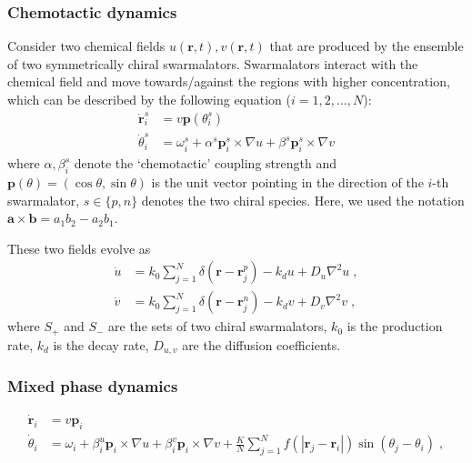 \documentclass{article}
\begin{document}
\subsubsection{Chemotactic dynamics}

Consider two chemical fields $u\left( \mathbf{r},t \right), v\left( \mathbf{r},t \right)$ that are produced by the ensemble of two symmetrically chiral swarmalators. Swarmalators interact with the chemical field and move towards/against the regions with higher concentration, which can be described by the following equation ($i=1, 2, \dots, N$):
\begin{subequations}
    \begin{align}
        \dot{\mathbf{r}}_{i}^{s}&=v\mathbf{p}\left(\theta_{i}^{s}\right)\\
        \dot{\theta}_{i}^{s}&=\omega _{i}^{s}+\alpha ^{s}\mathbf{p}_{i}^{s}\times \nabla u+\beta ^{s}\mathbf{p}_{i}^{s}\times \nabla v
    \end{align}
\end{subequations}
where $\alpha, \beta _{i}^{s}$ denote the ‘chemotactic’ coupling strength and $\mathbf{p}\left(\theta\right)=(\cos \theta,\sin \theta )$ is the unit vector pointing in the direction of the $i$-th swarmalator, $s\in\{p, n\}$ denotes the two chiral species. Here, we used the notation $\mathbf{a}\times\mathbf{b}=a_1 b_2-a_2 b_1$.

These two fields evolve as
\begin{subequations}
    \begin{align}
    \dot{u}&=k_0\sum_{j=1}^N{\delta \left( \mathbf{r}-\mathbf{r}_{j}^{p} \right)}-k_du+D_u\nabla ^2u\;,\\
    \dot{v}&=k_0\sum_{j=1}^N{\delta \left( \mathbf{r}-\mathbf{r}_{j}^{n} \right)}-k_dv+D_v\nabla ^2v\;,
    \end{align}
\end{subequations}
where $S_+$ and $S_-$ are the sets of two chiral swarmalators, $k_0$ is the production rate, $k_d$ is the decay rate, $D_{u,v}$ are the diffusion coefficients.

\subsubsection{Mixed phase dynamics}
\begin{subequations}
    \begin{align}
        \dot{\mathbf{r}}_i&=v\mathbf{p}_i\\
        \dot{\theta}_i&=\omega _i+\beta _{i}^{u}\mathbf{p}_i\times \nabla u+\beta _{i}^{v}\mathbf{p}_i\times \nabla v+\frac{K}{N}\sum_{j=1}^N{f}\left( \left| \mathbf{r}_j-\mathbf{r}_i \right| \right) \sin \left( \theta _j-\theta _i \right) \;,
    \end{align}
\end{subequations}
\end{document}
